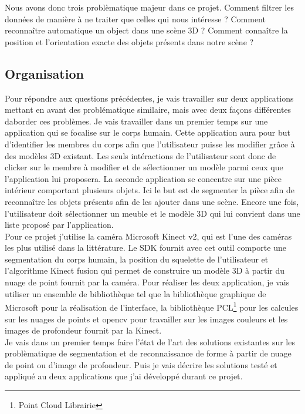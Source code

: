 Nous avons donc trois problèmatique majeur dans ce projet. Comment filtrer les données de manière à ne traiter que celles qui nous
intéresse ? Comment reconnaître automatique un object dans une scène 3D ? Comment connaître la position et l'orientation exacte des objets 
présents dans notre scène ?

\subsection{Organisation}

Pour répondre aux questions précédentes, je vais travailler sur deux applications mettant en avant des problématique similaire,
mais avec deux façons différentes daborder ces problèmes. Je vais travailler dans un premier temps sur une application qui se focalise
sur le corps humain. Cette application aura pour but d'identifier les membres du corps afin que l'utilisateur puisse les modifier
grâce à des modèles 3D existant. Les seuls intéractions de l'utilisateur sont donc de clicker sur le membre à modifier et de sélectionner
un modèle parmi ceux que l'application lui proposera. La seconde application se concentre sur une pièce intérieur comportant plusieurs
objets. Ici le but est de segmenter la pièce afin de reconnaître les objets présents afin de les ajouter dans une scène. Encore une fois,
l'utilisateur doit sélectionner un meuble et le modèle 3D qui lui convient dans une liste proposé par l'application.\\

Pour ce projet j'utilise la caméra Microsoft Kinect v2, qui est l'une des caméras les plus utilisé dans la littérature. Le SDK fournit
avec cet outil comporte une segmentation du corps humain, la position du squelette de l'utilisateur et l'algorithme Kinect fusion qui
permet de construire un modèle 3D à partir du nuage de point fournit par la caméra.
Pour réaliser les deux application, je vais utiliser un ensemble de bibliothèque tel que la bibliothèque graphique de Microsoft pour
la réalisation de l'interface, la bibliothèque PCL\footnote{Point Cloud Librairie}\cite{PCL} pour les calcules sur les nuages de points et 
opencv pour travailler sur les images couleurs et les images de profondeur fournit par la Kinect.\\

Je vais dans un premier temps faire l'état de l'art des solutions existantes sur les problèmatique de segmentation et de reconnaissance de
forme à partir de nuage de point ou d'image de profondeur. Puis je vais décrire les solutions testé et appliqué au deux applications que j'ai
développé durant ce projet.
